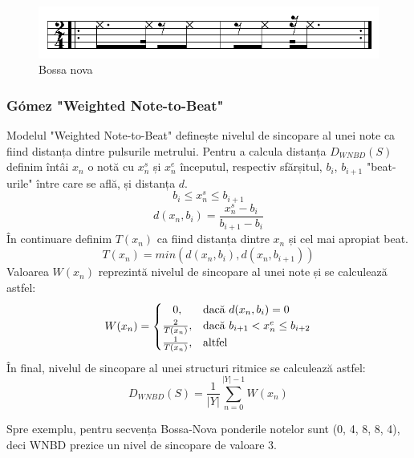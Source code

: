 \begin{figure}[H]
    \centering
    \includegraphics{images/bossa_nova.png}
    \caption{Bossa nova}
    \label{fig:bossa}
\end{figure}

\subsubsection{Gómez "Weighted Note-to-Beat"}
\label{wnbd}
\noindent Modelul "Weighted Note-to-Beat" \cite{Gomez} definește nivelul de sincopare al unei note ca fiind distanța dintre pulsurile metrului. Pentru a calcula distanța $D_{WNBD}(S)$ definim întâi $x_n$ o notă cu $x_n^s$ și $x_n^e$ începutul, respectiv sfărșitul, ${b_i}$, $b_{i+1}$ "beat-urile" între care se află, și distanța $d$.
\begin{equation}
    b_i \leq x_n^s \leq b_{i+1}
\end{equation}
\begin{equation}
    d(x_n, b_i) = \frac{x_n^s - b_i}{b_{i+1}-b_i}
\end{equation}
În continuare definim $T(x_n)$ ca fiind distanța dintre ${x_n}$ și cel mai apropiat beat.
\begin{equation}
    T(x_n) = min(d(x_n, b_i), d(x_n, b_{i+1}))
\end{equation}
Valoarea $W(x_n)$ reprezintă nivelul de sincopare al unei note și se calculează astfel:
\begin{equation}
    W(x_n) = 
    \begin{cases}
        \hfil 0, & \text{dacă } d(x_n, b_i) = 0 \\
        \frac{2}{T(x_n)}, & \text{dacă } b_{i+1} < x_n^e \leq b_{i+2} \\
        \frac{1}{T(x_n)}, & \text{altfel}
    \end{cases}
\end{equation}
În final, nivelul de sincopare al unei structuri ritmice se calculează astfel:
\begin{equation}
    D_{WNBD}(S) = \frac{1}{|Y|}\sum_{n=0}^{|Y|-1}{W(x_n)}
\end{equation}

Spre exemplu, pentru secvența Bossa-Nova ponderile notelor sunt (0, 4, 8, 8, 4), deci WNBD prezice un nivel de sincopare de valoare 3.

